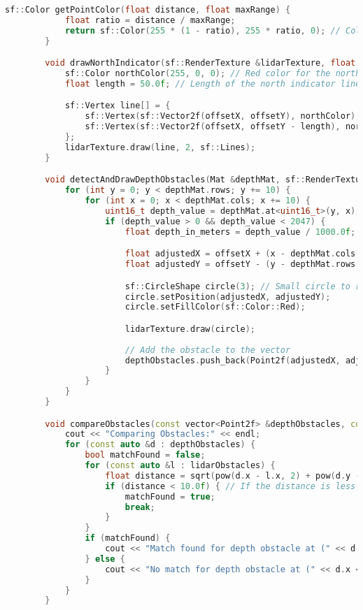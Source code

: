 \begin{lstlisting}[language={C++}, caption={C\'odigo de ejemplo de Kinect y LiDAR}, label={Script}]
        sf::Color getPointColor(float distance, float maxRange) {
            float ratio = distance / maxRange;
            return sf::Color(255 * (1 - ratio), 255 * ratio, 0); // Color from red to green
        }

        void drawNorthIndicator(sf::RenderTexture &lidarTexture, float offsetX, float offsetY) {
            sf::Color northColor(255, 0, 0); // Red color for the north indicator
            float length = 50.0f; // Length of the north indicator line

            sf::Vertex line[] = {
                sf::Vertex(sf::Vector2f(offsetX, offsetY), northColor),
                sf::Vertex(sf::Vector2f(offsetX, offsetY - length), northColor) // Line pointing upwards
            };
            lidarTexture.draw(line, 2, sf::Lines);
        }

        void detectAndDrawDepthObstacles(Mat &depthMat, sf::RenderTexture &lidarTexture, float offsetX, float offsetY, float scale, vector<Point2f> &depthObstacles) {
            for (int y = 0; y < depthMat.rows; y += 10) {
                for (int x = 0; x < depthMat.cols; x += 10) {
                    uint16_t depth_value = depthMat.at<uint16_t>(y, x);
                    if (depth_value > 0 && depth_value < 2047) {
                        float depth_in_meters = depth_value / 1000.0f;

                        float adjustedX = offsetX + (x - depthMat.cols / 2) * scale / depth_in_meters;
                        float adjustedY = offsetY - (y - depthMat.rows / 2) * scale / depth_in_meters; // Invert Y to match screen coordinates

                        sf::CircleShape circle(3); // Small circle to represent the obstacle
                        circle.setPosition(adjustedX, adjustedY);
                        circle.setFillColor(sf::Color::Red);

                        lidarTexture.draw(circle);
                        
                        // Add the obstacle to the vector
                        depthObstacles.push_back(Point2f(adjustedX, adjustedY));
                    }
                }
            }
        }

        void compareObstacles(const vector<Point2f> &depthObstacles, const vector<Point2f> &lidarObstacles) {
            cout << "Comparing Obstacles:" << endl;
            for (const auto &d : depthObstacles) {
                bool matchFound = false;
                for (const auto &l : lidarObstacles) {
                    float distance = sqrt(pow(d.x - l.x, 2) + pow(d.y - l.y, 2));
                    if (distance < 10.0f) { // If the distance is less than a threshold, consider it a match
                        matchFound = true;
                        break;
                    }
                }
                if (matchFound) {
                    cout << "Match found for depth obstacle at (" << d.x << ", " << d.y << ")" << endl;
                } else {
                    cout << "No match for depth obstacle at (" << d.x << ", " << d.y << ")" << endl;
                }
            }
        }


\end{lstlisting}
